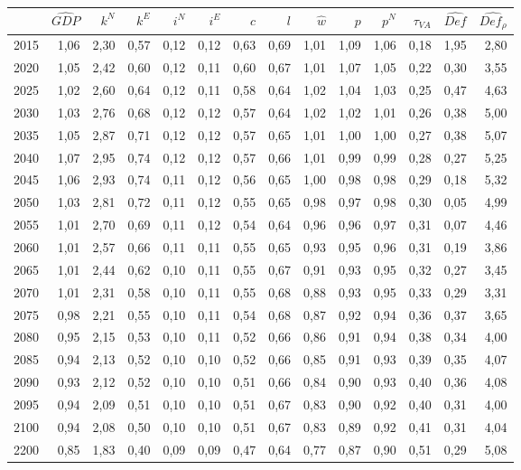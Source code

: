 \begin{tabular}{lrrrrrrrrrrrrr}
\toprule
 & $\hat{GDP}$ & $k^N$ & $k^E$ & $i^N$ & $i^E$ & $c$ & $l$ & $\hat{w}$ & $p$ & $p^N$ & $\tau_{VA}$ & $\hat{Def}$ & $\hat{Def_\rho}$ \\
\midrule
2015 & 1,06 & 2,30 & 0,57 & 0,12 & 0,12 & 0,63 & 0,69 & 1,01 & 1,09 & 1,06 & 0,18 & 1,95 & 2,80 \\
2020 & 1,05 & 2,42 & 0,60 & 0,12 & 0,11 & 0,60 & 0,67 & 1,01 & 1,07 & 1,05 & 0,22 & 0,30 & 3,55 \\
2025 & 1,02 & 2,60 & 0,64 & 0,12 & 0,11 & 0,58 & 0,64 & 1,02 & 1,04 & 1,03 & 0,25 & 0,47 & 4,63 \\
2030 & 1,03 & 2,76 & 0,68 & 0,12 & 0,12 & 0,57 & 0,64 & 1,02 & 1,02 & 1,01 & 0,26 & 0,38 & 5,00 \\
2035 & 1,05 & 2,87 & 0,71 & 0,12 & 0,12 & 0,57 & 0,65 & 1,01 & 1,00 & 1,00 & 0,27 & 0,38 & 5,07 \\
2040 & 1,07 & 2,95 & 0,74 & 0,12 & 0,12 & 0,57 & 0,66 & 1,01 & 0,99 & 0,99 & 0,28 & 0,27 & 5,25 \\
2045 & 1,06 & 2,93 & 0,74 & 0,11 & 0,12 & 0,56 & 0,65 & 1,00 & 0,98 & 0,98 & 0,29 & 0,18 & 5,32 \\
2050 & 1,03 & 2,81 & 0,72 & 0,11 & 0,12 & 0,55 & 0,65 & 0,98 & 0,97 & 0,98 & 0,30 & 0,05 & 4,99 \\
2055 & 1,01 & 2,70 & 0,69 & 0,11 & 0,12 & 0,54 & 0,64 & 0,96 & 0,96 & 0,97 & 0,31 & 0,07 & 4,46 \\
2060 & 1,01 & 2,57 & 0,66 & 0,11 & 0,11 & 0,55 & 0,65 & 0,93 & 0,95 & 0,96 & 0,31 & 0,19 & 3,86 \\
2065 & 1,01 & 2,44 & 0,62 & 0,10 & 0,11 & 0,55 & 0,67 & 0,91 & 0,93 & 0,95 & 0,32 & 0,27 & 3,45 \\
2070 & 1,01 & 2,31 & 0,58 & 0,10 & 0,11 & 0,55 & 0,68 & 0,88 & 0,93 & 0,95 & 0,33 & 0,29 & 3,31 \\
2075 & 0,98 & 2,21 & 0,55 & 0,10 & 0,11 & 0,54 & 0,68 & 0,87 & 0,92 & 0,94 & 0,36 & 0,37 & 3,65 \\
2080 & 0,95 & 2,15 & 0,53 & 0,10 & 0,11 & 0,52 & 0,66 & 0,86 & 0,91 & 0,94 & 0,38 & 0,34 & 4,00 \\
2085 & 0,94 & 2,13 & 0,52 & 0,10 & 0,10 & 0,52 & 0,66 & 0,85 & 0,91 & 0,93 & 0,39 & 0,35 & 4,07 \\
2090 & 0,93 & 2,12 & 0,52 & 0,10 & 0,10 & 0,51 & 0,66 & 0,84 & 0,90 & 0,93 & 0,40 & 0,36 & 4,08 \\
2095 & 0,94 & 2,09 & 0,51 & 0,10 & 0,10 & 0,51 & 0,67 & 0,83 & 0,90 & 0,92 & 0,40 & 0,31 & 4,00 \\
2100 & 0,94 & 2,08 & 0,50 & 0,10 & 0,10 & 0,51 & 0,67 & 0,83 & 0,89 & 0,92 & 0,41 & 0,31 & 4,04 \\
2200 & 0,85 & 1,83 & 0,40 & 0,09 & 0,09 & 0,47 & 0,64 & 0,77 & 0,87 & 0,90 & 0,51 & 0,29 & 5,08 \\
\bottomrule
\end{tabular}

